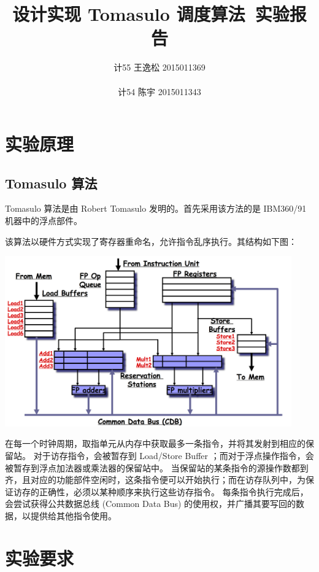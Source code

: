 \documentclass[11pt, a4paper]{article}
\title{设计实现 Tomasulo 调度算法~实验报告}
\author{计55 王逸松 2015011369 \\ \\ 计54 陈宇 2015011343}
\begin{document}
\maketitle

\section{实验原理}

\subsection{Tomasulo 算法}

Tomasulo 算法是由 Robert Tomasulo 发明的。首先采用该方法的是 IBM360/91 机器中的浮点部件。

该算法以硬件方式实现了寄存器重命名，允许指令乱序执行。其结构如下图：

\begin{center}
\includegraphics[width=350pt]{images/tomasulo-arch.png}
\end{center}

在每一个时钟周期，取指单元从内存中获取最多一条指令，并将其发射到相应的保留站。
对于访存指令，会被暂存到 Load/Store Buffer ；而对于浮点操作指令，会被暂存到浮点加法器或乘法器的保留站中。
当保留站的某条指令的源操作数都到齐，且对应的功能部件空闲时，这条指令便可以开始执行；而在访存队列中，为保证访存的正确性，必须以某种顺序来执行这些访存指令。
每条指令执行完成后，会尝试获得公共数据总线 (Common Data Bus) 的使用权，并广播其要写回的数据，以提供给其他指令使用。



\section{实验要求}
\end{document}
